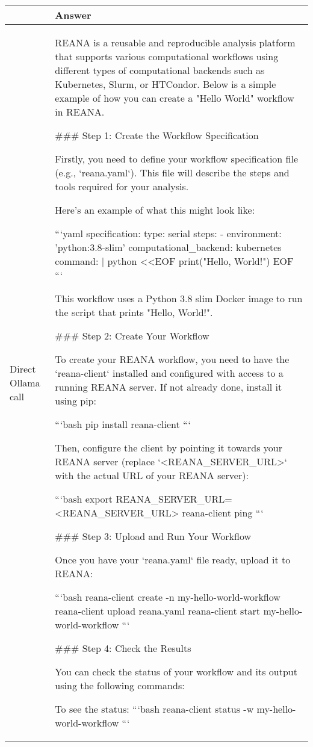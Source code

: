 \centering
\begin{longtable}[H]{|l|p{10cm}|}
\toprule
 & Answer \\
\midrule
Direct Ollama call & REANA is a reusable and reproducible analysis platform that supports various computational workflows using different types of computational backends such as Kubernetes, Slurm, or HTCondor. Below is a simple example of how you can create a "Hello World" workflow in REANA.

\#\#\# Step 1: Create the Workflow Specification

Firstly, you need to define your workflow specification file (e.g., `reana.yaml`). This file will describe the steps and tools required for your analysis.

Here's an example of what this might look like:

```yaml
specification:
  type: serial
  steps:
    - environment: 'python:3.8-slim'
      computational\_backend: kubernetes
      command: |
        python <<EOF
        print("Hello, World!")
        EOF
```

This workflow uses a Python 3.8 slim Docker image to run the script that prints "Hello, World!".

\#\#\# Step 2: Create Your Workflow

To create your REANA workflow, you need to have the `reana-client` installed and configured with access to a running REANA server. If not already done, install it using pip:

```bash
pip install reana-client
```

Then, configure the client by pointing it towards your REANA server (replace `<REANA\_SERVER\_URL>` with the actual URL of your REANA server):

```bash
export REANA\_SERVER\_URL=<REANA\_SERVER\_URL>
reana-client ping
```

\#\#\# Step 3: Upload and Run Your Workflow

Once you have your `reana.yaml` file ready, upload it to REANA:

```bash
reana-client create -n my-hello-world-workflow
reana-client upload reana.yaml
reana-client start my-hello-world-workflow
```

\#\#\# Step 4: Check the Results

You can check the status of your workflow and its output using the following commands:

To see the status:
```bash
reana-client status -w my-hello-world-workflow
```


\end{longtable}

